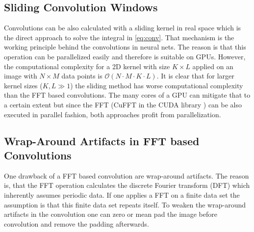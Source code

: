 \documentclass{juliacon}
\begin{document}
\subsection{Sliding Convolution Windows}
Convolutions can be also calculated with a sliding kernel in real space which is the direct approach to
solve the integral in \autoref{eq:conv}.
That mechanism is the working principle
behind the convolutions in neural nets. The reason is that this operation can be parallelized easily and therefore 
is suitable on GPUs. However, the computational complexity for a 2D kernel with size $K \times L$ applied on an image with
$N \times M$ data points is $\mathcal O(N \cdot M \cdot K \cdot L)$. It is clear that for larger kernel sizes ($K,L \gg 1$) the sliding method 
has worse computational complexity than the FFT based convolutions. The many cores of a GPU can mitigate that to a certain extent
but since the FFT (CuFFT in the CUDA library \cite{CUDA}) can be also executed in parallel fashion, both approaches profit from parallelization.


\subsection{Wrap-Around Artifacts in FFT based Convolutions}
    One drawback of a FFT based convolution are wrap-around artifacts. The reason is, that the FFT operation calculates the discrete
    Fourier transform (DFT) which inherently assumes periodic data. If one applies a FFT on a finite data set the assumption is that
    this finite data set repeats itself. 
    To weaken the wrap-around artifacts in the convolution one can zero or mean pad the image before convolution 
    and remove the padding afterwards.
\end{document}
